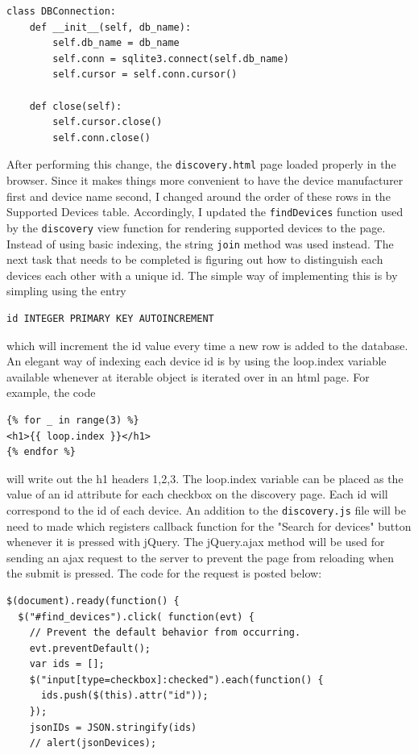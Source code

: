 \documentclass[fontsize=11pt, %
                             paper=letter, %
                             twoside, %
                             captions=tableheading,
                             index=totoc,
                             hyperref]{labbook}
\begin{document}
\begin{addmargin}[0cm]{0cm}
\begin{Verbatim}
class DBConnection:
    def __init__(self, db_name):
        self.db_name = db_name
        self.conn = sqlite3.connect(self.db_name)
        self.cursor = self.conn.cursor()

    def close(self):
        self.cursor.close()
        self.conn.close()
\end{Verbatim}
After performing this change, the \texttt{discovery.html} page loaded properly in the browser.
\smallbreak\noindent
Since it makes things more convenient to have the device manufacturer first and device name second, I changed around the order of these rows in the Supported Devices table. Accordingly, I updated the \texttt{findDevices} function used by the \texttt{discovery} view function for rendering supported devices to the page. Instead of using basic indexing, the string \texttt{join} method was used instead. The next task that needs to be completed is figuring out how to distinguish each devices each other with a unique id. The simple way of implementing this is by simpling using the entry
\begin{verbatim}
id INTEGER PRIMARY KEY AUTOINCREMENT
\end{verbatim}
which will increment the id value every time a new row is added to the database. An elegant way of indexing each device id is by using the loop.index variable available whenever at iterable object is iterated over in an html page. For example, the code
\begin{Verbatim}
{% for _ in range(3) %}
<h1>{{ loop.index }}</h1>
{% endfor %}
\end{Verbatim}
will write out the h1 headers 1,2,3. The loop.index variable can be placed as the value of an id attribute for each checkbox on the discovery page. Each id will correspond to the id of each device.
\smallbreak\noindent
An addition to the \texttt{discovery.js} file will be need to made which registers callback function for the "Search for devices" button whenever it is pressed with jQuery. The jQuery.ajax method will be used for sending an ajax request to the server to prevent the page from reloading when the submit is pressed. The code for the request is posted below:
\begin{Verbatim}[tabsize=4]
$(document).ready(function() {
  $("#find_devices").click( function(evt) {
    // Prevent the default behavior from occurring.
    evt.preventDefault();
    var ids = [];
    $("input[type=checkbox]:checked").each(function() {
      ids.push($(this).attr("id"));
    });
    jsonIDs = JSON.stringify(ids)
    // alert(jsonDevices);

\end{Verbatim}
\end{addmargin}
\end{document}
